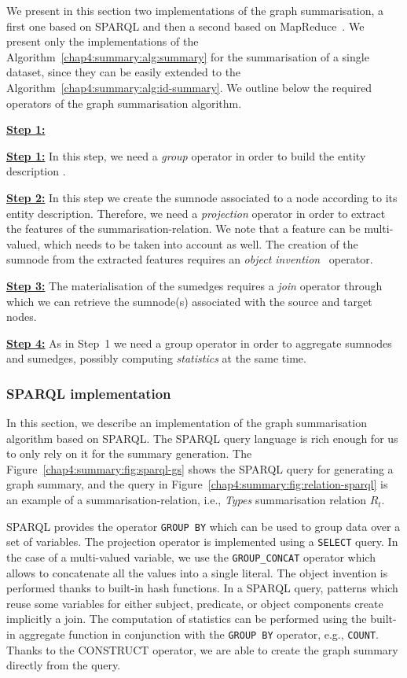 We present in this section two implementations of the graph summarisation, a first one based on SPARQL and then a second based on MapReduce~\cite{dean:2004:msd}. We present only the implementations of the Algorithm~\ref{chap4:summary:alg:summary} for the summarisation of a single dataset, since they can be easily extended to the Algorithm~\ref{chap4:summary:alg:id-summary}. We outline below the required operators of the graph summarisation algorithm.
\begin{labeling}{\textbf{\underline{Step 1:}}}
\item[\textbf{\underline{Step 1:}}] In this step, we need a \emph{group} operator in order to build the entity description .
\item[\textbf{\underline{Step 2:}}] In this step we create the sumnode associated to a node according to its entity description. Therefore, we need a \emph{projection} operator in order to extract the features of the \gls{summarisation-relation}. We note that a feature can be multi-valued, which needs to be taken into account as well. The creation of the sumnode from the extracted features requires an \emph{object invention}~\cite{hull:1989:usi} operator.
\item[\textbf{\underline{Step 3:}}] The materialisation of the sumedges requires a \emph{join} operator through which we can retrieve the sumnode(s) associated with the source and target nodes.
\item[\textbf{\underline{Step 4:}}] As in Step~1 we need a group operator in order to aggregate sumnodes and sumedges, possibly computing \emph{statistics} at the same time.
\end{labeling}

\subsubsection{SPARQL implementation}

In this section, we describe an implementation of the graph summarisation algorithm based on SPARQL. The SPARQL query language is rich enough for us to only rely on it for the summary generation.
The Figure~\ref{chap4:summary:fig:sparql-gs} shows the SPARQL query for generating a graph summary, and the query in Figure~\ref{chap4:summary:fig:relation-sparql} is an example of a \gls{summarisation-relation}, i.e., \emph{Types} summarisation relation $R_t$.


SPARQL provides the operator \texttt{GROUP BY} which can be used to group data over a set of variables. The projection operator is implemented using a \texttt{SELECT} query. In the case of a multi-valued variable, we use the \texttt{GROUP\_CONCAT} operator which allows to concatenate all the values into a single literal. The object invention is performed thanks to built-in hash functions. In a SPARQL query, patterns which reuse some variables for either subject, predicate, or object components create implicitly a join. The computation of statistics can be performed using the built-in aggregate function in conjunction with the \texttt{GROUP BY} operator, e.g., \texttt{COUNT}. Thanks to the CONSTRUCT operator, we are able to create the graph summary directly from the query.


